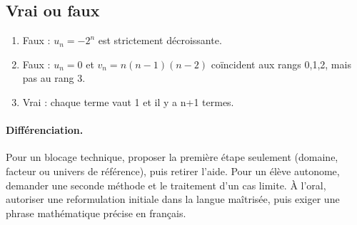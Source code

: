 \subsection*{Vrai ou faux}
\begin{enumerate}
\item Faux : $u_n=-2^n$ est strictement décroissante.
\item Faux : $u_n=0$ et $v_n=n(n-1)(n-2)$ coïncident aux rangs 0,1,2, mais pas au rang 3.
\item Vrai : chaque terme vaut 1 et il y a n+1 termes.
\end{enumerate}
\paragraph{Différenciation.} Pour un blocage technique, proposer la première étape seulement (domaine, facteur ou univers de référence), puis retirer l’aide. Pour un élève autonome, demander une seconde méthode et le traitement d’un cas limite. À l’oral, autoriser une reformulation initiale dans la langue maîtrisée, puis exiger une phrase mathématique précise en français.
